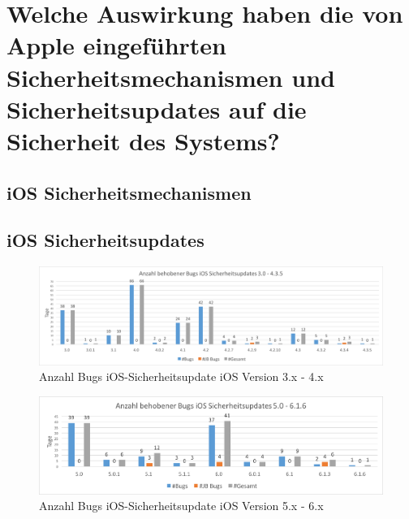 \section{Welche Auswirkung haben die von Apple eingeführten Sicherheitsmechanismen und Sicherheitsupdates auf die Sicherheit des Systems?}
\label{sec:Frage2}
\subsection{iOS Sicherheitsmechanismen}
\label{sec:Frage2SecMechanismen}

\subsection{iOS Sicherheitsupdates}
\label{sec:Frage2SecUpdate}
\begin{figure}[htbp]
        \centering
                \includegraphics[scale=0.4]{Bilder/iOSSicherheitsupdate3.png}
        \caption{Anzahl Bugs iOS-Sicherheitsupdate iOS Version 3.x - 4.x}
        \label{fig:AnalyseiOSSicherheitsupdate3}
\end{figure}
     
\begin{figure}[htbp]
        \centering
                \includegraphics[scale=0.55]{Bilder/iOSSicherheitsupdate5.png}
        \caption{Anzahl Bugs iOS-Sicherheitsupdate iOS Version 5.x - 6.x}
        \label{fig:AnalyseiOSSicherheitsupdate5}
\end{figure}

